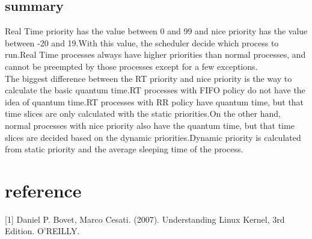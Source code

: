 \documentclass[10pt,a4paper]{ltjsarticle}       %
\begin{document}
\subsection{summary}
Real Time priority has the value between 0 and 99 and nice priority has the value between -20 and 19.With this value, the scheduler decide which process to run.Real Time processes always have higher priorities than normal processes, and cannot be preempted by those processes except for a few exceptions.\\
The biggest difference between the RT priority and nice priority is the way to calculate the basic quantum time.RT processes with FIFO policy do not have the idea of quantum time.RT processes with RR policy have quantum time, but that time slices are only calculated with the static priorities.On the other hand, normal processes with nice priority also have the quantum time, but that time slices are decided based on the dynamic priorities.Dynamic priority is calculated from static priority and the average sleeping time of the process.
\section{reference}
[1] Daniel P. Bovet, Marco Cesati. (2007). Understanding Linux Kernel, 3rd Edition. O'REILLY.
\end{document}
